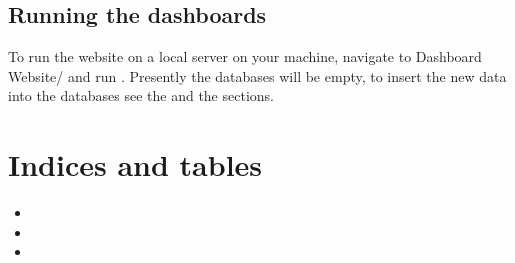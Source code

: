 \documentclass[letterpaper,10pt,english]{sphinxmanual}
\begin{document}
\section{Running the dashboards}
\label{\detokenize{running:running-the-dashboards}}
To run the website on a local server on your machine, navigate to Dashboard Website/ and run . Presently the databases will be empty, to insert the new data into the databases see the {\hyperref[\detokenize{mongoDB_data_ingestion:ingesting-data-into-mongodb}]{}} and the {\hyperref[\detokenize{neo4j_data_ingestion:ingesting-data-into-neo4j}]{}} sections.


\chapter{Indices and tables}
\label{\detokenize{index:indices-and-tables}}\begin{itemize}
\item {} 

\item {} 

\item {} 

\end{itemize}



\renewcommand{\indexname}{Index}
\printindex
\end{document}
